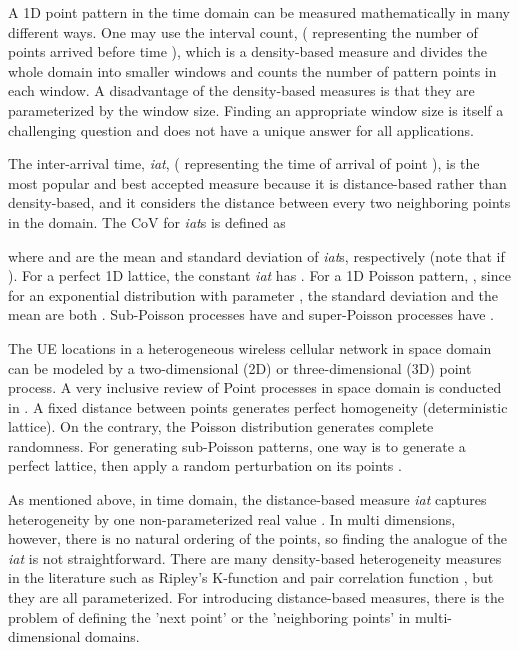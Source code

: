 \documentclass[journal]{IEEEtran}
\begin{document}
A 1D point pattern in the time domain can be measured mathematically in many different ways. One may use the interval count,  ( representing the number of points arrived before time ), which is a density-based measure and divides the whole domain into smaller windows and counts the number of pattern points in each window. A disadvantage of the density-based measures is that they are parameterized by the window size. Finding an appropriate window size is itself a challenging question and does not have a unique answer for all applications.

The inter-arrival time, \textit{iat},  ( representing the time of arrival of point ), is the most popular and best accepted measure because it is distance-based rather than density-based, and it considers the distance between every two neighboring points in the domain. The CoV for \textit{iat}s is defined as

where  and  are the mean and standard deviation of \textit{iat}s, respectively (note that  if ). For a perfect 1D lattice, the constant \textit{iat} has . For a 1D Poisson pattern, , since for an exponential distribution with parameter , the standard deviation and the mean are both . Sub-Poisson processes have  and super-Poisson processes have .

The UE locations in a heterogeneous wireless cellular network in space domain can be modeled by a two-dimensional (2D) or three-dimensional (3D) point process. A very inclusive review of Point processes in space domain is conducted in \cite{blaszczyszyn2012clustering}. A fixed distance between points generates perfect homogeneity (deterministic lattice). On the contrary, the Poisson distribution generates complete randomness. For generating sub-Poisson patterns, one way is to generate a perfect lattice, then apply a random perturbation on its points \cite{rataj1993convergence,lucarini2008symmetry,blaszczyszyn2012clustering}.

As mentioned above, in time domain, the distance-based measure \textit{iat} captures heterogeneity by one non-parameterized real value . In multi dimensions, however, there is no natural ordering of the points, so finding the analogue of the \textit{iat} is not straightforward. There are many density-based heterogeneity measures in the literature such as Ripley's K-function and pair correlation function \cite{blaszczyszyn2012clustering}, but they are all parameterized. For introducing distance-based measures, there is the problem of defining the 'next point' or the 'neighboring points' in multi-dimensional domains.
\end{document}
